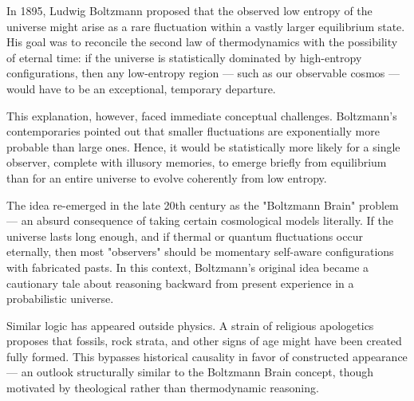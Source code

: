 \begin{historical}
In 1895, Ludwig Boltzmann proposed that the observed low entropy of the universe might arise as a rare fluctuation within a vastly larger equilibrium state. His goal was to reconcile the second law of thermodynamics with the possibility of eternal time: if the universe is statistically dominated by high-entropy configurations, then any low-entropy region — such as our observable cosmos — would have to be an exceptional, temporary departure.

This explanation, however, faced immediate conceptual challenges. Boltzmann's contemporaries pointed out that smaller fluctuations are exponentially more probable than large ones. Hence, it would be statistically more likely for a single observer, complete with illusory memories, to emerge briefly from equilibrium than for an entire universe to evolve coherently from low entropy.

The idea re-emerged in the late 20th century as the "Boltzmann Brain" problem — an absurd consequence of taking certain cosmological models literally. If the universe lasts long enough, and if thermal or quantum fluctuations occur eternally, then most "observers" should be momentary self-aware configurations with fabricated pasts. In this context, Boltzmann’s original idea became a cautionary tale about reasoning backward from present experience in a probabilistic universe.

Similar logic has appeared outside physics. A strain of religious apologetics proposes that fossils, rock strata, and other signs of age might have been created fully formed. This bypasses historical causality in favor of constructed appearance — an outlook structurally similar to the Boltzmann Brain concept, though motivated by theological rather than thermodynamic reasoning.
\end{historical}
